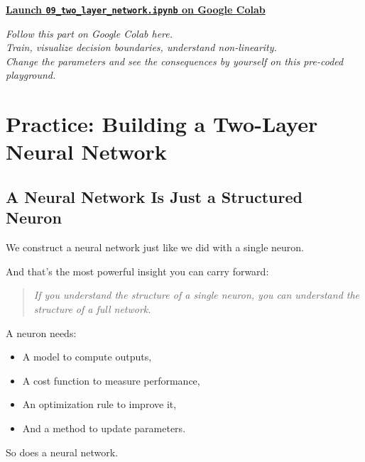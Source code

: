 \documentclass[11pt]{article}
\begin{document}
\begin{tcolorbox}[enhanced, sharp corners=south, colback=white, colframe=black!80,
  boxrule=0.8pt, drop shadow southeast,
  width=\textwidth, before skip=10pt, after skip=10pt, halign=center,
  fontupper=\sffamily\large]

\href{https://colab.research.google.com/github/Pchambet/Deep-Learning-from-Scratch/blob/main/notebooks/09_two_layer_network.ipynb}{
  \quad \textbf{\large Launch \texttt{09\_two\_layer\_network.ipynb} on Google Colab}
}

\vspace{0.5em}

{\color{gray!80!black}\small%
\textit{Follow this part on Google Colab here.}\\
\textit{Train, visualize decision boundaries, understand non-linearity.}\\
\textit{Change the parameters and see the consequences by yourself on this pre-coded playground.}
}
\end{tcolorbox}



\section*{Practice: Building a Two-Layer Neural Network}

\subsection*{A Neural Network Is Just a Structured Neuron}

We construct a neural network just like we did with a single neuron.

And that’s the most powerful insight you can carry forward:
\begin{quote}
\textit{If you understand the structure of a single neuron, you can understand the structure of a full network.}
\end{quote}

A neuron needs:
\begin{itemize}
    \item A model to compute outputs,
    \item A cost function to measure performance,
    \item An optimization rule to improve it,
    \item And a method to update parameters.
\end{itemize}

So does a neural network.
\end{document}
